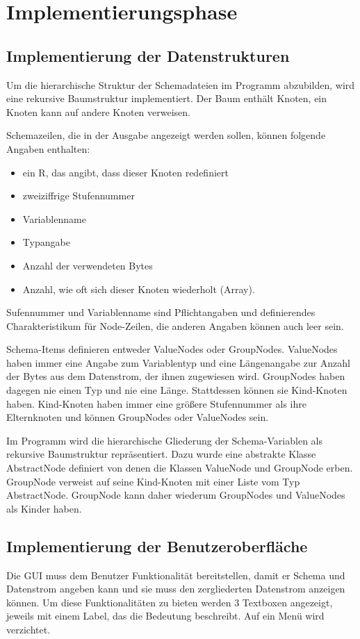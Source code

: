\section{Implementierungsphase} 
\label{sec:Implementierungsphase}

\subsection{Implementierung der Datenstrukturen}
\label{sec:ImplementierungDatenstrukturen}
Um die hierarchische Struktur der Schemadateien im Programm abzubilden, wird eine rekursive Baumstruktur implementiert. Der Baum enthält Knoten, ein Knoten kann auf andere Knoten verweisen.


Schemazeilen, die in der Ausgabe angezeigt werden sollen, können folgende Angaben enthalten:
\begin{itemize}
\item ein R, das angibt, dass dieser Knoten redefiniert
\item zweiziffrige Stufennummer
\item Variablenname
\item Typangabe
\item Anzahl der verwendeten Bytes
\item Anzahl, wie oft sich dieser Knoten wiederholt (Array).
\end{itemize}
Sufennummer und Variablenname sind Pflichtangaben und definierendes Charakteristikum für Node-Zeilen, die anderen Angaben können auch leer sein.

Schema-Items definieren entweder ValueNodes oder GroupNodes.
ValueNodes haben immer eine Angabe zum Variablentyp und eine Längenangabe zur Anzahl der Bytes aus dem Datenstrom, der ihnen zugewiesen wird.
GroupNodes haben dagegen nie einen Typ und nie eine Länge. Stattdessen können sie Kind-Knoten haben. Kind-Knoten haben immer eine größere Stufennummer als ihre Elternknoten und können GroupNodes oder ValueNodes sein.

Im Programm wird die hierarchische Gliederung der Schema-Variablen als rekursive Baumstruktur repräsentiert. Dazu wurde eine abstrakte Klasse AbstractNode definiert von denen die Klassen ValueNode und GroupNode erben. GroupNode verweist auf seine Kind-Knoten mit einer Liste vom Typ AbstractNode. GroupNode kann daher wiederum GroupNodes und ValueNodes als Kinder haben.

\subsection{Implementierung der Benutzeroberfläche}
\label{sec:ImplementierungBenutzeroberflaeche}
Die \ac{GUI} muss dem Benutzer Funktionalität bereitstellen, damit er Schema und Datenstrom angeben kann und sie muss den zergliederten Datenstrom anzeigen können.
Um diese Funktionalitäten zu bieten werden 3 Textboxen angezeigt, jeweils mit einem Label, das die Bedeutung beschreibt. Auf ein Menü wird verzichtet.

